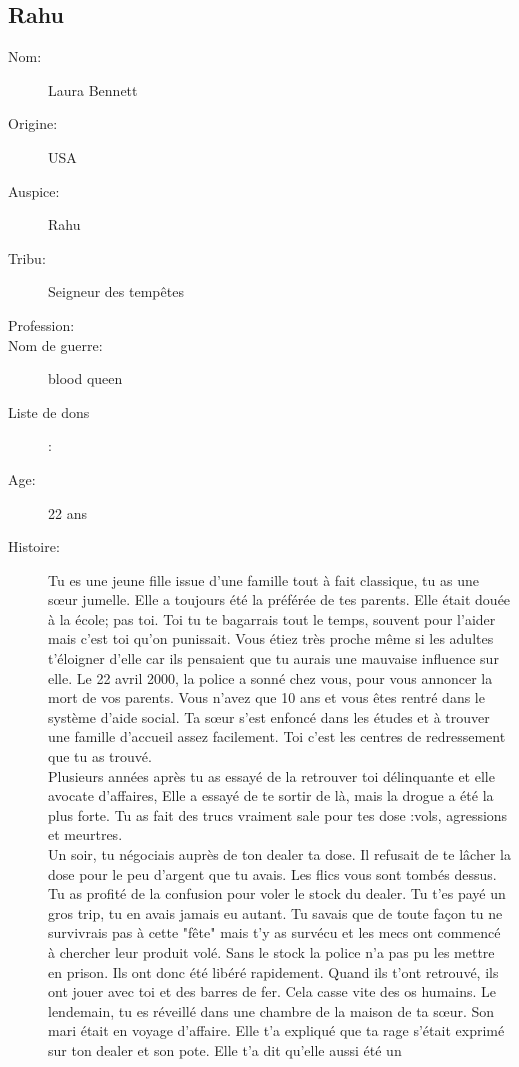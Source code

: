 \documentclass[oneside,12pt]{book}
\begin{document}
\begin{flushleft}
\section{Rahu}
\begin{description}
\item[Nom:]{Laura Bennett}
\item[Origine:]{USA}
\item[Auspice:]{Rahu}
\item[Tribu:]{Seigneur des tempêtes}
\item[Profession:]{}
\item[Nom de guerre:]{blood queen}
\item[Liste de dons]:
\item[Age:]{22 ans}
\item[Histoire:]{
{\footnotesize Tu es une jeune fille issue d'une famille tout à fait classique, tu as une sœur jumelle. Elle a toujours été la préférée de tes parents. Elle était douée à la école; pas toi. Toi tu te bagarrais tout le temps, souvent
pour l'aider mais c'est toi qu'on punissait.
Vous étiez très proche même si les adultes t'éloigner d'elle car ils pensaient que tu aurais une mauvaise influence sur elle. Le 22 avril 2000, la police a sonné chez vous, pour vous annoncer la mort de vos parents.
Vous n'avez que 10 ans et vous êtes rentré dans le système d'aide social. Ta sœur s'est enfoncé dans les études et à trouver une famille d'accueil assez facilement. Toi c'est les centres de redressement que tu as
trouvé.\\
Plusieurs années après tu as essayé de la retrouver toi délinquante et elle avocate d'affaires,
Elle a essayé de te sortir de là, mais la drogue a été la plus forte.  Tu as fait des trucs vraiment sale pour tes dose :vols, agressions et meurtres.
\\
Un soir, tu négociais auprès de ton dealer ta dose. Il refusait de te lâcher la dose pour le peu d'argent que tu avais. Les flics vous sont tombés dessus. Tu as profité de la confusion pour voler le stock du dealer.
Tu t'es payé un gros trip, tu en avais jamais eu autant. Tu savais que de toute façon tu ne survivrais pas à cette "fête" mais t'y as survécu et les mecs ont commencé à chercher leur produit volé. Sans le stock la police
n'a pas pu les mettre en prison. Ils ont donc été libéré rapidement. Quand ils t'ont retrouvé, ils ont jouer avec toi et des barres de fer. Cela casse vite des os humains.
Le lendemain, tu es réveillé dans une chambre de la maison de ta sœur. Son mari était en voyage d'affaire. Elle t'a expliqué que ta rage s'était exprimé sur ton dealer et son pote. Elle t'a dit qu'elle aussi été un
}}
\end{description}
\end{flushleft}
\end{document}
